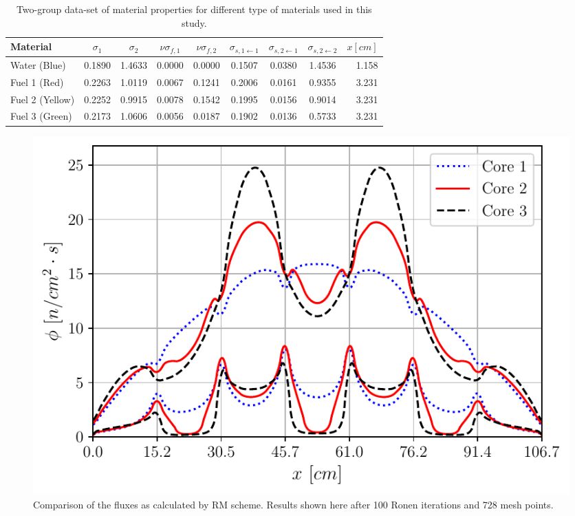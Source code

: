 \begin{figure}[htbp!]
\end{figure}

\begin{table}[!htbp]	
	\centering
	\caption{Two-group data-set of material properties for different type of materials used in this study.} %
	\label{tab:xs}
	\begin{tabular}{lcccccccr}
		Material&$\sigma_1$&$\sigma_2$&$\nu\sigma_{f,1}$&$\nu\sigma_{f,2}$&$\sigma_{s,1\leftarrow 1}$&$\sigma_{s,2\leftarrow 1}$&$\sigma_{s,2\leftarrow 2}$&$x[cm]$\\
		\midrule
		Water  (Blue)	&0.1890	 &1.4633  &0.0000	 &0.0000	 &0.1507   &0.0380		&1.4536		 &1.158\\
		Fuel 1 (Red)	&0.2263  &1.0119  &0.0067	 &0.1241	 &0.2006   &0.0161		&0.9355		 &3.231\\
		Fuel 2 (Yellow)	&0.2252  &0.9915  &0.0078	 &0.1542 	 &0.1995   &0.0156		&0.9014		 &3.231\\
		Fuel 3 (Green)	&0.2173  &1.0606  &0.0056	 &0.0187	 &0.1902   &0.0136		&0.5733 	 &3.231\\
	\end{tabular}
\end{table}


\begin{figure}[htbp!]
	\centering
	\includegraphics[width=0.45\linewidth]{RM_100it_8_20_728.pdf}
	\caption{Comparison of the fluxes as calculated by RM scheme. Results shown here after 100 Ronen iterations and 728 mesh points.}
	\label{fig:Dcoef}
\end{figure}

